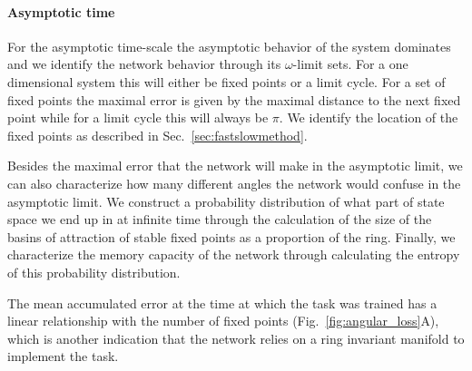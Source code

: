 \documentclass{article} %
\newcounter{ct}
\newcommand{\manifold}{\mathcal{M}}
\DeclareMathOperator{\basin}{Basin}
\theoremstyle{definition}
\theoremstyle{remark}
\begin{document}
\paragraph{Asymptotic time}

For the asymptotic time-scale the asymptotic behavior of the system dominates and we identify the network behavior through its $\omega$-limit sets.
For a one dimensional system this will either be fixed points or a limit cycle.
For a set of fixed points the maximal error is given by the maximal distance to the next fixed point while for a limit cycle this will always be $\pi$.
We identify the location of the fixed points as described in Sec.~\ref{sec:fastslowmethod}.


Besides the maximal error that the network will make in the asymptotic limit, we can also characterize how many different angles the network would confuse in the asymptotic limit.
We construct a probability distribution of what part of state space we end up in at infinite time through the calculation of the size of the basins of attraction of stable fixed points as a proportion of the ring.
Finally, we characterize the memory capacity of the network through calculating the entropy of this probability distribution.



The mean accumulated error at the time at which the task was trained has a linear relationship with the number of fixed points (Fig.~\ref{fig:angular_loss}A), which is another indication that the network relies on a ring invariant manifold to implement the task.

\end{document}
